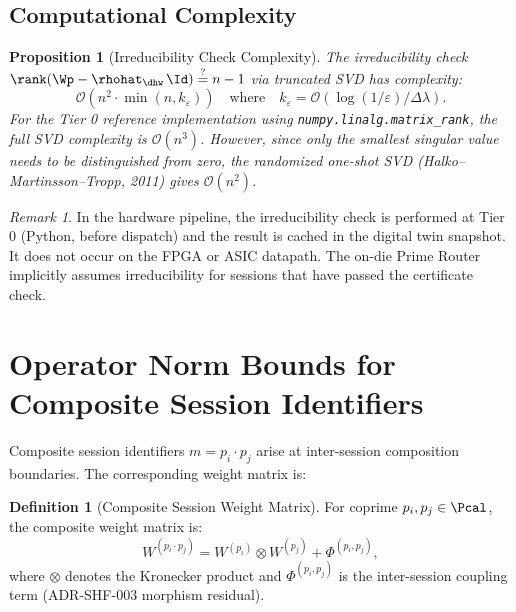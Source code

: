\documentclass[12pt,letterpaper]{article}
\theoremstyle{plain}
\newtheorem{proposition}[theorem]{Proposition}
\theoremstyle{definition}
\newtheorem{definition}[theorem]{Definition}
\theoremstyle{remark}
\newtheorem{remark}[theorem]{Remark}
\begin{document}
\subsection{Computational Complexity}

\begin{proposition}[Irreducibility Check Complexity]
\label{prop:irred-complexity}
The irreducibility check \(\rank(\Wp - \rhohat_{\dhw}\,\Id) \stackrel{?}{=} n-1\)
via truncated SVD has complexity:
\begin{equation}
  \mathcal{O}(n^2 \cdot \min(n, k_\varepsilon))
  \quad\text{where}\quad
  k_\varepsilon = \mathcal{O}\!\left(\log(1/\varepsilon)/\Delta\lambda\right).
  \label{eq:complexity}
\end{equation}
For the Tier 0 reference implementation using \texttt{numpy.linalg.matrix\_rank},
the full SVD complexity is \(\mathcal{O}(n^3)\). However, since only the
smallest singular value needs to be distinguished from zero, the randomized
one-shot SVD (Halko--Martinsson--Tropp, 2011) gives \(\mathcal{O}(n^2)\).
\end{proposition}

\begin{remark}
In the hardware pipeline, the irreducibility check is performed at Tier 0
(Python, before dispatch) and the result is cached in the digital twin
snapshot. It does not occur on the FPGA or ASIC datapath. The on-die
Prime Router implicitly assumes irreducibility for sessions that have passed
the certificate check.
\end{remark}

\section{Operator Norm Bounds for Composite Session Identifiers}
\label{sec:composite}

Composite session identifiers \(m = p_i \cdot p_j\) arise at inter-session
composition boundaries. The corresponding weight matrix is:

\begin{definition}[Composite Session Weight Matrix]
For coprime \(p_i, p_j \in \Pcal\), the composite weight matrix is:
\[
  W^{(p_i \cdot p_j)} = W^{(p_i)} \otimes W^{(p_j)} + \Phi^{(p_i, p_j)},
\]
where \(\otimes\) denotes the Kronecker product and \(\Phi^{(p_i,p_j)}\)
is the inter-session coupling term (ADR-SHF-003 morphism residual).
\end{definition}
\end{document}
